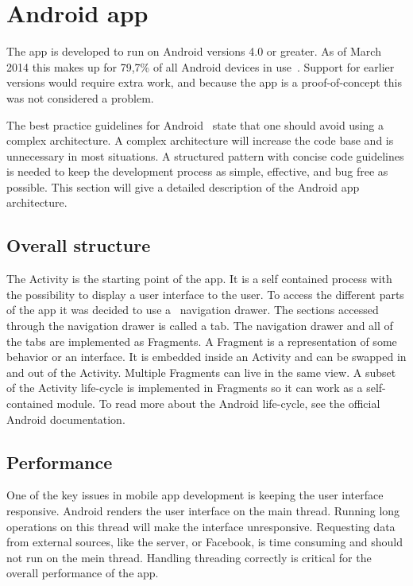 \section{Android app}
\label{sec:arch_app}
The app is developed to run on Android versions 4.0 or greater. As of March 2014 this makes up for 79,7\% of all Android devices in use~\cite{AndroidDeviceFragmentation}.
Support for earlier versions would require extra work, and because the app is a proof-of-concept this was not considered a problem.

The best practice guidelines for Android~\cite{androidPracticePerformance} state that one should avoid using a complex architecture. A complex architecture will increase the code base and is unnecessary in most situations. A structured pattern with concise code guidelines is needed to keep the development process as simple, effective, and bug free as possible. This section will give a detailed description of the Android app architecture. 

\subsection{Overall structure}
The Activity is the starting point of the app. It is a self contained process with the possibility to display a user interface to the user. To access the different parts of the app it was decided to use a ~\gls{navigation drawer}. The sections accessed through the navigation drawer is called a tab. The navigation drawer and all of the tabs are implemented as Fragments. A Fragment is a representation of some behavior or an interface. It is embedded inside an Activity and can be swapped in and out of the Activity. Multiple Fragments can live in the same view. A subset of the Activity life-cycle is implemented in Fragments so it can work as a self-contained module. To read more about the Android life-cycle, see the official Android documentation.~\cite{androiddoc}

\subsection{Performance}
One of the key issues in mobile app development is keeping the user interface responsive. Android renders the user interface on the main thread. Running long operations on this thread will make the interface unresponsive. Requesting data from external sources, like the server, or Facebook, is time consuming and should not run on the mein thread. Handling threading correctly is critical for the overall performance of the app.

